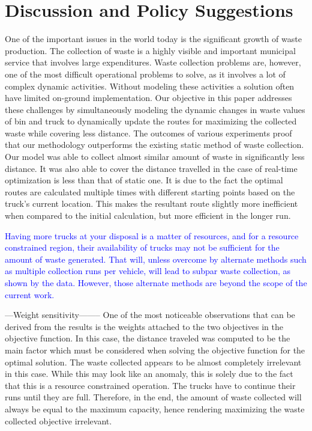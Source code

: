 \documentclass[12pt]{article}
\begin{document}
\section{Discussion and Policy Suggestions}

One of the important issues in the world today is the significant growth of waste production. The collection of waste is a highly visible and important municipal service that involves large expenditures. Waste collection problems are, however, one of the most difficult operational problems to solve, as it involves a lot of complex dynamic activities. Without modeling these activities a solution often have limited on-ground implementation. Our objective in this paper addresses these challenges by simultaneously modeling the dynamic changes in waste values of bin and truck to dynamically update the routes for maximizing the collected waste while covering less distance. The outcomes of various experiments proof that our methodology outperforms the existing static method of waste collection. Our model was able to collect almost similar amount of waste in significantly less distance. It was also able to cover the distance travelled in the case of real-time optimization is less than that of static one. It is due to the fact the optimal routes are calculated multiple times with different starting points based on the truck's current location. This makes the resultant route slightly more inefficient when compared to the initial calculation, but more efficient in the longer run.



\textcolor{blue}{Having more trucks at your disposal is a matter of resources, and for a resource constrained region, their availability of trucks may not be sufficient for the amount of waste generated. That will, unless overcome by alternate methods such as multiple collection runs per vehicle, will lead to subpar waste collection, as shown by the data. However, those alternate methods are beyond the scope of the current work.
}

---Weight sensitivity--------
One of the most noticeable observations that can be derived from the results is the weights attached to the two objectives in the objective function. In this case, the distance traveled was computed to be the main factor which must be considered when solving the objective function for the optimal solution. The waste collected appears to be almost completely irrelevant in this case. While this may look like an anomaly, this is solely due to the fact that this is a resource constrained operation. The trucks  have to continue their runs until they are full. Therefore, in the end, the amount of waste collected will always be equal to the maximum capacity, hence rendering maximizing the waste collected objective irrelevant.
\end{document}
